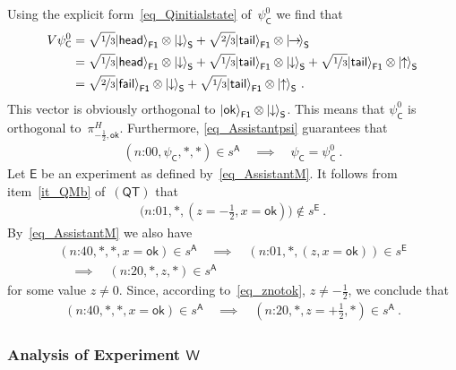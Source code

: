 \documentclass[12pt]{article}
\theoremstyle{plain}
\theoremstyle{definition}
\newcommand*{\ket}[1]{{| #1 \rangle}}
\newcommand*{\Exp}{\mathsf{E}}
\newcommand*{\Friendone}{\mathsf{F1}}
\newcommand*{\Assistant}{\mathsf{A}}
\newcommand*{\Wigner}{\mathsf{W}}
\newcommand*{\Spin}{\mathsf{S}}
\newcommand*{\Coin}{\mathsf{C}}
\newcommand*{\spinup}{\ket{{\hspace{-0.1ex}\uparrow\hspace{-0.1ex}}}}
\newcommand*{\spindown}{\ket{{\hspace{-0.1ex}\downarrow\hspace{-0.1ex}}}}
\newcommand*{\spinright}{\ket{{\hspace{-0.2ex}\rightarrow\hspace{-0.4ex}}}}
\newcommand*{\sminus}{{\textstyle - \frac{1}{2}}}
\newcommand*{\splus}{{\textstyle + \frac{1}{2}}}
\newcommand*{\QT}{\mathsf{(QT)}}
\newcommand*{\ok}{\mathsf{ok}}
\newcommand*{\fail}{\mathsf{fail}}
\newcommand*{\head}{\mathsf{head}}
\newcommand*{\tail}{\mathsf{tail}}
\begin{document}
Using the explicit form~\eqref{eq_Qinitialstate} of~$\psi^0_{\Coin}$ we find that 
\begin{align}
  V \psi^0_\Coin 
  & = \sqrt{\nicefrac{1}{3}}\ket{\head}_{\Friendone}  \otimes  \spindown_\Spin + \sqrt{\nicefrac{2}{3}} \ket{\tail}_{\Friendone}  \otimes \spinright_\Spin\nonumber \\
    & = \sqrt{\nicefrac{1}{3}}  \ket{\head}_{\Friendone} \otimes  \spindown_\Spin  + \sqrt{\nicefrac{1}{3}}   \ket{\tail}_{\Friendone}  \otimes \spindown_\Spin  + \sqrt{\nicefrac{1}{3}} \ket{\tail}_{\Friendone} \otimes  \spinup_\Spin  \nonumber \\
  & = \sqrt{\nicefrac{2}{3}}  \ket{\fail}_{\Friendone} \otimes \spindown_\Spin + \sqrt{\nicefrac{1}{3}}  \ket{\tail}_{\Friendone}  \otimes \spinup_\Spin \ . \label{eq_jointstatetwo}
\end{align}
This vector is obviously orthogonal to $\ket{\ok}_{\Friendone} \otimes \spindown_{\Spin} $.  This means that $\psi^0_{\Coin}$ is orthogonal  to~$\pi^H_{-\frac{1}{2}, \ok}$.  Furthermore, \eqref{eq_Assistantpsi} guarantees that
\begin{align*}
  (\text{$n$:00}, \psi_{\Coin}, * , *) \in s^{\Assistant} \quad \implies \quad \psi_{\Coin} = \psi^0_{\Coin} \ .
\end{align*}
Let $\Exp$ be an experiment as defined by~\eqref{eq_AssistantM}.  It follows from item~\ref{it_QMb} of~$\QT$ that
\begin{align} \label{eq_znotok}
  \bigl(\text{$n$:01}, *, (z = \sminus, x = \ok) \bigr) \notin s^{\Exp} \ .
\end{align}
By~\eqref{eq_AssistantM} we also have
\begin{multline*}
  (\text{$n$:40}, * , *, x=\ok) \in s^{\Assistant}  \quad \implies \quad 
    (\text{$n$:01}, *, (z, x = \ok)) \in s^{\Exp}  \\ \quad \implies \quad 
  (\text{$n$:20}, * , z, *) \in s^{\Assistant} 
\end{multline*}
for some value $z \neq 0$.  Since, according to~\eqref{eq_znotok}, $z \neq \sminus$, we conclude that
\begin{align} \label{eq_QTAssistant}
  (\text{$n$:40}, * , *, x=\ok) \in s^{\Assistant}  
  \quad \implies \quad
 (\text{$n$:20}, * , z=\splus, *) \in s^{\Assistant} \ .
 \end{align}

\subsubsection*{Analysis of Experiment $\Wigner$} 
\end{document}
